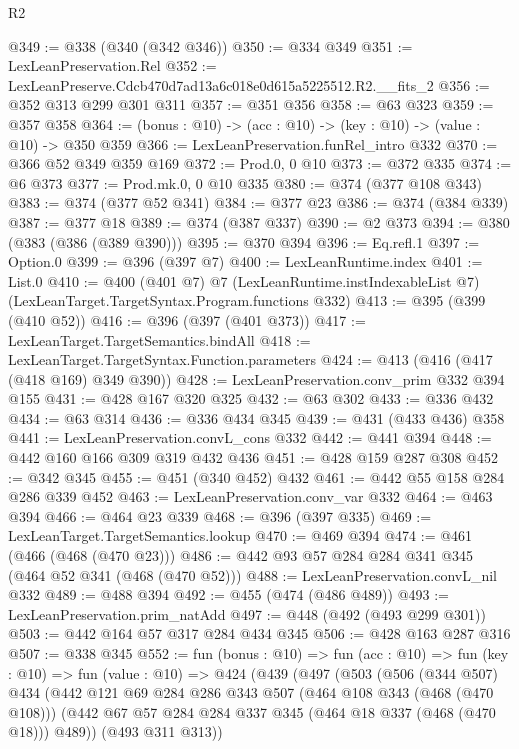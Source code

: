 \begin{lexlean}{R2}
\begin{coremodule}
@349 := @338 (@340 (@342 @346))
@350 := @334 @349
@351 := LexLeanPreservation.Rel
@352 := LexLeanPreserve.Cdcb470d7ad13a6c018e0d615a5225512.R2.__fits_2
@356 := @352 @313 @299 @301 @311
@357 := @351 @356
@358 := @63 @323
@359 := @357 @358
@364 := (bonus : @10) -> (acc : @10) -> (key : @10) -> (value : @10) -> @350 @359
@366 := LexLeanPreservation.funRel_intro @332
@370 := @366 @52 @349 @359 @169
@372 := Prod.{0, 0} @10
@373 := @372 @335
@374 := @6 @373
@377 := Prod.mk.{0, 0} @10 @335
@380 := @374 (@377 @108 @343)
@383 := @374 (@377 @52 @341)
@384 := @377 @23
@386 := @374 (@384 @339)
@387 := @377 @18
@389 := @374 (@387 @337)
@390 := @2 @373
@394 := @380 (@383 (@386 (@389 @390)))
@395 := @370 @394
@396 := Eq.refl.{1}
@397 := Option.{0}
@399 := @396 (@397 @7)
@400 := LexLeanRuntime.index
@401 := List.{0}
@410 := @400
    (@401 @7)
    @7
    (LexLeanRuntime.instIndexableList @7)
    (LexLeanTarget.TargetSyntax.Program.functions @332)
@413 := @395 (@399 (@410 @52))
@416 := @396 (@397 (@401 @373))
@417 := LexLeanTarget.TargetSemantics.bindAll
@418 := LexLeanTarget.TargetSyntax.Function.parameters
@424 := @413 (@416 (@417 (@418 @169) @349 @390))
@428 := LexLeanPreservation.conv_prim @332 @394 @155
@431 := @428 @167 @320 @325
@432 := @63 @302
@433 := @336 @432
@434 := @63 @314
@436 := @336 @434 @345
@439 := @431 (@433 @436) @358
@441 := LexLeanPreservation.convL_cons @332
@442 := @441 @394
@448 := @442 @160 @166 @309 @319 @432 @436
@451 := @428 @159 @287 @308
@452 := @342 @345
@455 := @451 (@340 @452) @432
@461 := @442 @55 @158 @284 @286 @339 @452
@463 := LexLeanPreservation.conv_var @332
@464 := @463 @394
@466 := @464 @23 @339
@468 := @396 (@397 @335)
@469 := LexLeanTarget.TargetSemantics.lookup
@470 := @469 @394
@474 := @461 (@466 (@468 (@470 @23)))
@486 := @442 @93 @57 @284 @284 @341 @345 (@464 @52 @341 (@468 (@470 @52)))
@488 := LexLeanPreservation.convL_nil @332
@489 := @488 @394
@492 := @455 (@474 (@486 @489))
@493 := LexLeanPreservation.prim_natAdd
@497 := @448 (@492 (@493 @299 @301))
@503 := @442 @164 @57 @317 @284 @434 @345
@506 := @428 @163 @287 @316
@507 := @338 @345
@552 := fun (bonus : @10) =>
  fun (acc : @10) =>
  fun (key : @10) =>
  fun (value : @10) =>
  @424
    (@439
      (@497
        (@503
          (@506
            (@344 @507)
            @434
            (@442
              @121
              @69
              @284
              @286
              @343
              @507
              (@464 @108 @343 (@468 (@470 @108)))
              (@442 @67 @57 @284 @284 @337 @345 (@464 @18 @337 (@468 (@470 @18))) @489))
            (@493 @311 @313))

\end{coremodule}
\end{lexlean}
